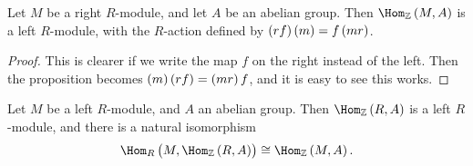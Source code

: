 \begin{proposition}
Let $ M $ be a right $ R $-module, and let $ A $ be an abelian group. Then $ \Hom_\ZZ\br{M, A} $ is a left $ R $-module, with the $ R $-action defined by $ \br{rf}\br{m} = f\br{mr} $.
\end{proposition}

\begin{proof}
This is clearer if we write the map $ f $ on the right instead of the left. Then the proposition becomes $ \br{m}\br{rf} = \br{mr}f $, and it is easy to see this works.
\end{proof}

\begin{proposition}
Let $ M $ be a left $ R $-module, and $ A $ an abelian group. Then $ \Hom_\ZZ\br{R, A} $ is a left $ R $-module, and there is a natural isomorphism
$$ \Hom_R\br{M, \Hom_\ZZ\br{R, A}} \cong \Hom_\ZZ\br{M, A}. $$
\end{proposition}

